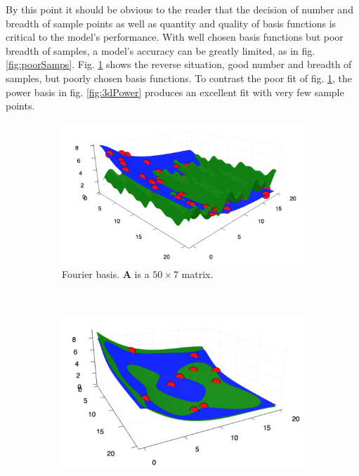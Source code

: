 \par By this point it should be obvious to the reader that the decision of number and breadth of sample points as well as quantity and quality of basis functions is critical to the model's performance. With well chosen basis functions but poor breadth of samples, a model's accuracy can be greatly limited, as in fig. \ref{fig:poorSamps}. Fig. \ref{fig:3dFourier} shows the reverse situation, good number and breadth of samples, but poorly chosen basis functions. To contrast the poor fit of fig. \ref{fig:3dFourier}, the power basis in fig. \ref{fig:3dPower} produces an excellent fit with very few sample points.

\begin{figure}
  \centering
  \begin{subfigure}{0.85\textwidth}
    \includegraphics[width=\linewidth]{Figures/3dFourier}
    \caption{Fourier basis. $\mathbf{A}$ is a $50\times7$ matrix.} 
    \label{fig:3dFourier}
  \end{subfigure}%
  \\
  \begin{subfigure}{0.8\textwidth}
    \includegraphics[width=\linewidth]{Figures/3dPower}

\end{subfigure}
\end{figure}
